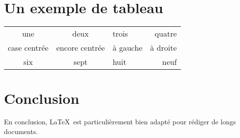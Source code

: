 \documentclass{article}           %
\begin{document}
\section{Un exemple de tableau}
\begin{tabular}{|*{2}{c|}l r|}
   \hline
   une & deux & trois & quatre \\
   case centrée & encore centrée & à gauche & à droite \\
   \hline
   six & sept & huit & neuf \\
   \hline
\end{tabular}
\section{Conclusion}               %
En conclusion, \LaTeX\ est
particulièrement bien adapté pour
rédiger de longs documents.


\end{document}
